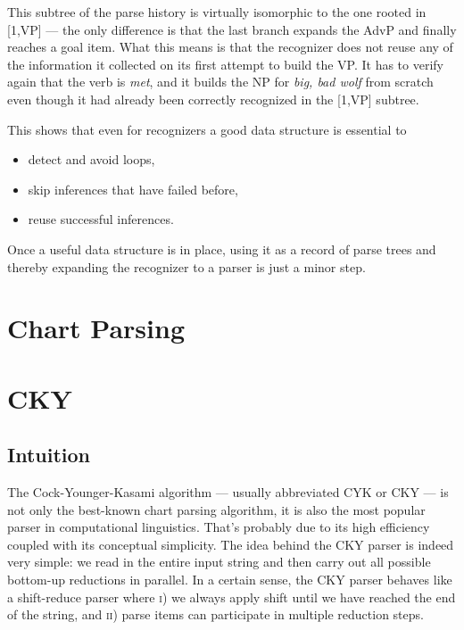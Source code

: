 \begin{examplebox}
\begin{center}
    \end{center}
    This subtree of the parse history is virtually isomorphic to the one rooted in [1,\psep VP] --- the only difference is that the last branch expands the AdvP and finally reaches a goal item.
    What this means is that the recognizer does not reuse any of the information it collected on its first attempt to build the VP\@.
    It has to verify again that the verb is \emph{met}, and it builds the NP for \emph{big, bad wolf} from scratch even though it had already been correctly recognized in the [1,\psep VP] subtree.
\end{examplebox}
%
This shows that even for recognizers a good data structure is essential to
%
\begin{itemize}
    \item detect and avoid loops,
    \item skip inferences that have failed before,
    \item reuse successful inferences.
\end{itemize}
%
Once a useful data structure is in place, using it as a record of parse trees and thereby expanding the recognizer to a parser is just a minor step.

\section{Chart Parsing}

\section{CKY}

\subsection{Intuition}

The Cock-Younger-Kasami algorithm --- usually abbreviated CYK or CKY --- is not only the best-known chart parsing algorithm, it is also the most popular parser in computational linguistics.
That's probably due to its high efficiency coupled with its conceptual simplicity.
The idea behind the CKY parser is indeed very simple: we read in the entire input string and then carry out all possible bottom-up reductions in parallel.
In a certain sense, the CKY parser behaves like a shift-reduce parser where \textsc{i}) we always apply shift until we have reached the end of the string, and \textsc{ii}) parse items can participate in multiple reduction steps.

